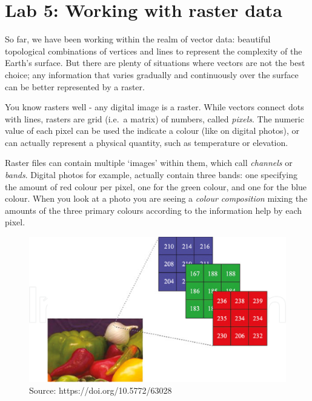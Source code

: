 \documentclass[
  letterpaper,
  DIV=11,
  numbers=noendperiod]{scrreprt}
\begin{document}
\chapter{Lab 5: Working with raster data}\label{sec-labras1}

So far, we have been working within the realm of vector data: beautiful
topological combinations of vertices and lines to represent the
complexity of the Earth's surface. But there are plenty of situations
where vectors are not the best choice; any information that varies
gradually and continuously over the surface can be better represented by
a raster.

You know rasters well - any digital image is a raster. While vectors
connect dots with lines, rasters are grid (i.e.~a matrix) of numbers,
called \emph{pixels}. The numeric value of each pixel can be used the
indicate a colour (like on digital photos), or can actually represent a
physical quantity, such as temperature or elevation.

Raster files can contain multiple `images' within them, which call
\emph{channels} or \emph{bands}. Digital photos for example, actually
contain three bands: one specifying the amount of red colour per pixel,
one for the green colour, and one for the blue colour. When you look at
a photo you are seeing a \emph{colour composition} mixing the amounts of
the three primary colours according to the information help by each
pixel.

\begin{figure}[H]

{\centering \includegraphics{index_files/mediabag/4-Figure3-1.png}

}

\caption{Source: https://doi.org/10.5772/63028}

\end{figure}%
\end{document}

